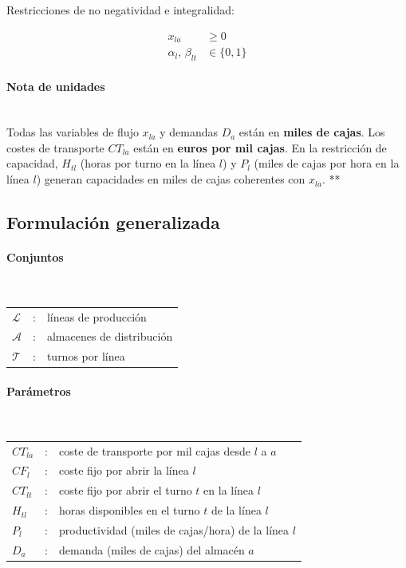 Restricciones de no negatividad e integralidad:

\begin{align}
x_{la} &\ge 0 \\
\alpha_l,\,\beta_{lt} &\in \{0,1\}
\end{align}

\paragraph{Nota de unidades}\mbox{}\\
Todas las variables de flujo $x_{la}$ y demandas $D_a$ están en \textbf{miles de cajas}.  
Los costes de transporte $CT_{la}$ están en \textbf{euros por mil cajas}.  
En la restricción de capacidad, $H_{tl}$ (horas por turno en la línea $l$) y $P_l$ (miles de cajas por hora en la línea $l$) generan capacidades en miles de cajas coherentes con $x_{la}$.
**

\subsection{Formulación generalizada}

\paragraph{Conjuntos}\mbox{}\\
\begin{tabular}{lcl}
$\mathcal{L}$ & : & líneas de producción\\
$\mathcal{A}$ & : & almacenes de distribución\\
$\mathcal{T}$ & : & turnos por línea\\
\end{tabular}

\paragraph{Parámetros}\mbox{}\\
\begin{tabular}{lcl}
$CT_{la}$ & : & coste de transporte por mil cajas desde $l$ a $a$\\
$CF_l$ & : & coste fijo por abrir la línea $l$\\
$CT_{lt}$ & : & coste fijo por abrir el turno $t$ en la línea $l$\\
$H_{tl}$ & : & horas disponibles en el turno $t$ de la línea $l$\\
$P_l$ & : & productividad (miles de cajas/hora) de la línea $l$\\
$D_a$ & : & demanda (miles de cajas) del almacén $a$\\
\end{tabular}

